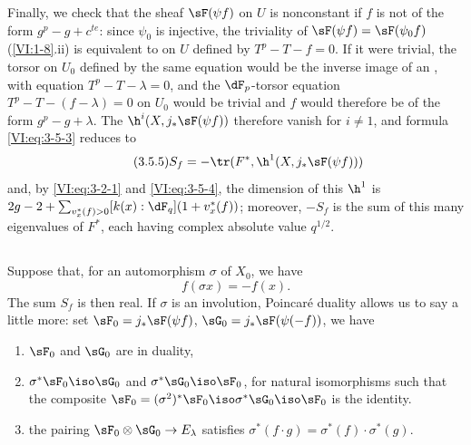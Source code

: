 Finally, we check that the sheaf $\sF(\psi f)$ on $U$ is nonconstant if 
$f$ is not of the form $g^p-g+c^{t e}$: since $\psi_0$ is injective, the 
triviality of $\sF(\psi f)=\sF(\psi_0 f)$ (\ref{VI:1-8}.ii) is equivalent to 
 on $U$ defined by $T^p-T-f=0$. If it were trivial, 
the torsor on $U_0$ defined by the same equation 
would be the inverse image of an 
, with equation $T^p-T-\lambda=0$, and the 
$\dF_p$-torsor equation $T^p-T-(f-\lambda)=0$ on $U_0$ would be trivial 
and $f$ would therefore be of the form $g^p-g+\lambda$. The 
$\h^i(X,j_\ast \sF(\psi f))$ therefore vanish for $i\ne 1$, and formula 
\eqref{VI:eq:3-5-3} reduces to 
\begin{equation*}\tag{3.5.5}\label{VI:eq:3-5-5}
  S_f = -\tr(F^\ast,\h^1(X,j_\ast \sF(\psi f))) 
\end{equation*}
and, by \eqref{VI:eq:3-2-1} and \eqref{VI:eq:3-5-4}, the dimension of this $\h^1$ is 
$2 g-2+\sum_{v_x^\ast(f)>0} [k(x):\dF_q](1+v_x^\ast(f))$; moreover, $-S_f$ 
is the sum of this many eigenvalues of $F^\ast$, each having complex 
absolute value $q^{1/2}$. 





\subsection{}\label{VI:3-6}

Suppose that, for an automorphism $\sigma$ of $X_0$, we have 
\[
  f(\sigma x) = - f(x) \text{.} 
\]
The sum $S_f$ is then real. If $\sigma$ is an involution, Poincaré 
duality allows us to say a little more: set 
$\sF_0=j_\ast \sF(\psi f)$, $\sG_0 = j_\ast \sF(\psi(-f))$, we have 
\begin{enumerate}[\indent a)]
  \item $\sF_0$ and $\sG_0$ are in duality, 
  \item $\sigma^\ast \sF_0 \iso \sG_0$ and $\sigma^\ast \sG_0 \iso \sF_0$, for 
    natural isomorphisms such that the composite 
    $\sF_0=(\sigma^2)^\ast \sF_0 \iso \sigma^\ast \sG_0 \iso \sF_0$ 
    is the identity. 
  \item the pairing $\sF_0\otimes \sG_0 \to E_\lambda$ satisfies 
    $\sigma^\ast(f\cdot g) = \sigma^\ast(f) \cdot \sigma^\ast (g)$. 
\end{enumerate} 

